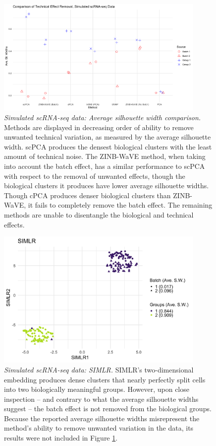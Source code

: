 \documentclass{article}
\begin{document}
\begin{figure}[!htbp]
    \centering
    \includegraphics[width=0.9\textwidth]{figures/technical_effect_removal_sim}
    \caption{{\em Simulated scRNA-seq data: Average silhouette width comparison.}
    Methods are displayed in decreasing order of ability to remove unwanted technical variation, as measured by the average silhouette width. scPCA produces the densest biological clusters with the least amount of technical noise. The ZINB-WaVE method, when taking into account the batch effect, has a similar performance to scPCA with respect to the removal of unwanted effects, though the biological clusters it produces have lower average silhouette widths. Though cPCA produces denser biological clusters than ZINB-WaVE, it fails to completely remove the batch effect. The remaining methods are unable to disentangle the biological and technical effects. 
    }
    \label{fig:ave_sil_widths}
\end{figure}

\begin{figure}[!htbp]
    \centering
    \includegraphics[width=0.9\textwidth]{figures/simulated_SIMLR.png}
    \caption{
    {\em Simulated scRNA-seq data: SIMLR.}
     SIMLR's two-dimensional embedding produces dense clusters that nearly perfectly split cells into two biologically meaningful groups. However, upon close inspection -- and contrary to what the average silhouette widths suggest -- the batch effect is not removed from the biological groups. Because the reported average silhouette widths misrepresent the method's ability to remove unwanted variation in the data, its results were not included in Figure \ref{fig:ave_sil_widths}.}
    \label{fig:simulated_SIMLR}
\end{figure}
\end{document}
